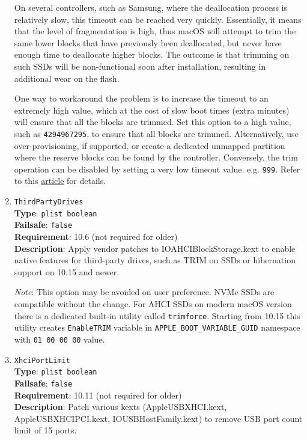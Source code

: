 \documentclass[]{article}
\begin{document}
\begin{enumerate}
  On several controllers, such as Samsung, where the deallocation process is relatively slow,
  this timeout can be reached very quickly. Essentially, it means that the level of
  fragmentation is high, thus macOS will attempt to trim the same lower blocks that
  have previously been deallocated, but never have enough time to deallocate higher
  blocks. The outcome is that trimming on such SSDs will be non-functional soon
  after installation, resulting in additional wear on the flash.

  One way to workaround the problem is to increase the timeout to an extremely
  high value, which at the cost of slow boot times (extra minutes) will
  ensure that all the blocks are trimmed. Set this option to a high value,
  such as \texttt{4294967295}, to ensure that all blocks are trimmed.
  Alternatively, use over-provisioning, if supported, or create
  a dedicated unmapped partition where the reserve blocks can be found
  by the controller. Conversely, the trim operation can be disabled by
  setting a very low timeout value. e.g. \texttt{999}. Refer to this
  \href{https://interface31.ru/tech_it/2015/04/mozhno-li-effektivno-ispolzovat-ssd-bez-podderzhki-trim.html}{article}
  for details.

\item
  \texttt{ThirdPartyDrives}\\
  \textbf{Type}: \texttt{plist\ boolean}\\
  \textbf{Failsafe}: \texttt{false}\\
  \textbf{Requirement}: 10.6 (not required for older)\\
  \textbf{Description}: Apply vendor patches to IOAHCIBlockStorage.kext to enable
  native features for third-party drives, such as TRIM on SSDs or hibernation
  support on 10.15 and newer.

  \emph{Note}: This option may be avoided on user preference. NVMe SSDs are
  compatible without the change. For AHCI SSDs on modern macOS version there
  is a dedicated built-in utility called \texttt{trimforce}. Starting from 10.15
  this utility creates \texttt{EnableTRIM} variable in \texttt{APPLE\_BOOT\_VARIABLE\_GUID}
  namespace with \texttt{01 00 00 00} value.

\item
  \texttt{XhciPortLimit}\\
  \textbf{Type}: \texttt{plist\ boolean}\\
  \textbf{Failsafe}: \texttt{false}\\
  \textbf{Requirement}: 10.11 (not required for older)\\
  \textbf{Description}: Patch various kexts (AppleUSBXHCI.kext, AppleUSBXHCIPCI.kext,
  IOUSBHostFamily.kext) to remove USB port count limit of 15 ports.


\end{enumerate}
\end{document}
